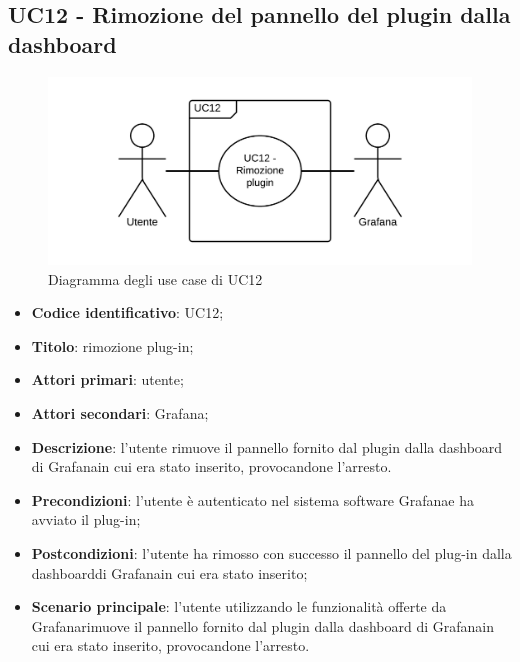 \subsection{UC12 - Rimozione del pannello del plugin dalla dashboard}
\begin{figure}[H]
\includegraphics{img/UC12_-_Rimozione_plugin.png}
\caption{Diagramma degli use case di UC12}
\end{figure}
\begin{itemize}
    \item \textbf{Codice identificativo}: UC12;
    \item \textbf{Titolo}: rimozione plug-in;
    \item \textbf{Attori primari}: utente;
    \item \textbf{Attori secondari}: Grafana\glo;
    \item \textbf{Descrizione}: l'utente rimuove il pannello fornito dal plugin dalla dashboard di Grafana\glosp in cui era stato inserito, provocandone l'arresto.
    \item \textbf{Precondizioni}: l'utente è autenticato nel sistema software Grafana\glosp e ha avviato il plug-in;
    \item \textbf{Postcondizioni}: l'utente ha rimosso con successo il pannello del plug-in dalla dashboard\glosp di Grafana\glo in cui era stato inserito;
    \item \textbf{Scenario principale}: l'utente utilizzando le funzionalità offerte da Grafana\glosp rimuove il pannello fornito dal plugin dalla dashboard di Grafana\glosp in cui era stato inserito, provocandone l'arresto.
\end{itemize}

